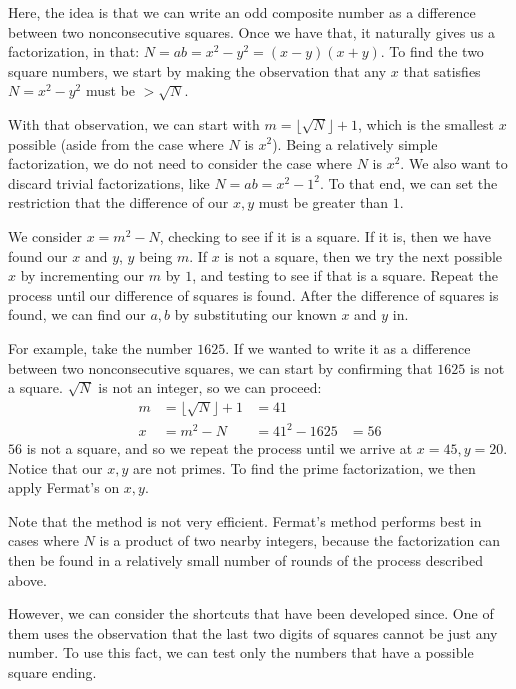 \documentclass{article}
\begin{document}
\par Here, the idea is that we can write an odd composite number as a difference between two nonconsecutive
squares. Once we have that, it naturally gives us a factorization, in that: $N = ab = x^2 - y^2 = (x-y)(x+y)$.
To find the two square numbers, we start by making the observation that any $x$ that satisfies $N=x^2-y^2$
must be $> \sqrt{N}$.

\par With that observation, we can start with $m=\lfloor \sqrt{N} \rfloor+1$, which is the smallest $x$ possible (aside
from the case where $N$ is $x^2$). Being a relatively simple factorization, we do not need to consider the case
where $N$ is $x^2$. We also want to discard trivial factorizations, like $N = ab = x^2 - 1^2$. To that end, we
can set the restriction that the difference of our $x,y$ must be greater than $1$.

\par We consider $x=m^2-N$, checking to see if it is a square. If it is, then we have found our $x$ and $y$, $y$
being $m$. If $x$ is not a square, then we try the next possible $x$ by incrementing our $m$ by $1$, and testing to see
if that is a square. Repeat the process until our difference of squares is found. After the difference of squares
is found, we can find our $a,b$ by substituting our known $x$ and $y$ in.

\par For example, take the number $1625$. If we wanted to write it as a difference between two nonconsecutive squares,
we can start by confirming that $1625$ is not a square. $\sqrt{N}$ is not an integer, so we can proceed:
\begin{align*}
    m &= \lfloor \sqrt{N} \rfloor+1 &= 41 \\
    x &= m^2-N &= 41^2 - 1625 &= 56
\end{align*}
$56$ is not a square, and so we repeat the process until we arrive at $x = 45, y = 20$. Notice that our $x,y$ are
not primes. To find the prime factorization, we then apply Fermat's on $x,y$.

\par Note that the method is not very efficient. Fermat's method performs best in cases where $N$ is a product of
two nearby integers, because the factorization can then be found in a relatively small number of rounds of the
process described above.

\par However, we can consider the shortcuts that have been developed since. One of them uses the observation that
the last two digits of squares cannot be just any number. To use this fact, we can test only the numbers that have a
possible square ending.
\end{document}
